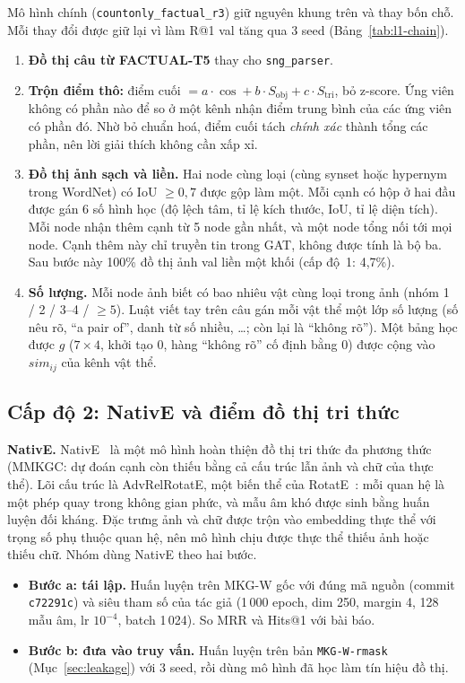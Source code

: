 Mô hình chính (\texttt{countonly\_factual\_r3}) giữ nguyên khung trên và thay bốn chỗ. Mỗi thay đổi được giữ lại vì làm R@1
val tăng qua 3 seed (Bảng~\ref{tab:l1-chain}).
\begin{enumerate}
\item \textbf{Đồ thị câu từ FACTUAL-T5} thay cho \texttt{sng\_parser}.
\item \textbf{Trộn điểm thô:} điểm cuối $= a\cdot\cos + b\cdot S_\text{obj} + c\cdot S_\text{tri}$, bỏ z-score. Ứng viên
không có phần nào để so ở một kênh nhận điểm trung bình của các ứng viên có phần đó. Nhờ bỏ chuẩn hoá, điểm cuối tách
\emph{chính xác} thành tổng các phần, nên lời giải thích không cần xấp xỉ.
\item \textbf{Đồ thị ảnh sạch và liền.} Hai node cùng loại (cùng synset hoặc hypernym trong WordNet) có IoU $\ge 0{,}7$ được
gộp làm một. Mỗi cạnh có hộp ở hai đầu được gán 6 số hình học (độ lệch tâm, tỉ lệ kích thước, IoU, tỉ lệ diện tích). Mỗi
node nhận thêm cạnh từ 5 node gần nhất, và một node tổng nối tới mọi node. Cạnh thêm này chỉ truyền tin trong GAT, không
được tính là bộ ba. Sau bước này 100\% đồ thị ảnh val liền một khối (cấp độ~1: 4,7\%).
\item \textbf{Số lượng.} Mỗi node ảnh biết có bao nhiêu vật cùng loại trong ảnh (nhóm 1 / 2 / 3--4 / $\ge5$). Luật viết tay
trên câu gán mỗi vật thể một lớp số lượng (số nêu rõ, ``a pair of'', danh từ số nhiều, \dots; còn lại là ``không rõ''). Một
bảng học được $g$ ($7\times4$, khởi tạo 0, hàng ``không rõ'' cố định bằng 0) được cộng vào $\mathit{sim}_{ij}$ của kênh vật
thể.
\end{enumerate}

\subsection{Cấp độ 2: NativE và điểm đồ thị tri thức}
\label{sec:method-l2}

\textbf{NativE.} NativE~\cite{zhang2024native} là một mô hình hoàn thiện đồ thị tri thức đa phương thức (MMKGC: dự đoán
cạnh còn thiếu bằng cả cấu trúc lẫn ảnh và chữ của thực thể). Lõi cấu trúc là AdvRelRotatE, một biến thể của
RotatE~\cite{sun2019rotate}: mỗi quan hệ là một phép quay trong không gian phức, và mẫu âm khó được sinh bằng huấn luyện đối
kháng. Đặc trưng ảnh và chữ được trộn vào embedding thực thể với trọng số phụ thuộc quan hệ, nên mô hình chịu được thực
thể thiếu ảnh hoặc thiếu chữ. Nhóm dùng NativE theo hai bước.
\begin{itemize}
\item \textbf{Bước a: tái lập.} Huấn luyện trên MKG-W gốc với đúng mã nguồn (commit \texttt{c72291c}) và siêu tham số của
tác giả (1\,000 epoch, dim 250, margin 4, 128 mẫu âm, lr $10^{-4}$, batch 1\,024). So MRR và Hits@1 với bài báo.
\item \textbf{Bước b: đưa vào truy vấn.} Huấn luyện trên bản \texttt{MKG-W-rmask} (Mục~\ref{sec:leakage}) với 3 seed, rồi dùng
mô hình đã học làm tín hiệu đồ thị.
\end{itemize}

